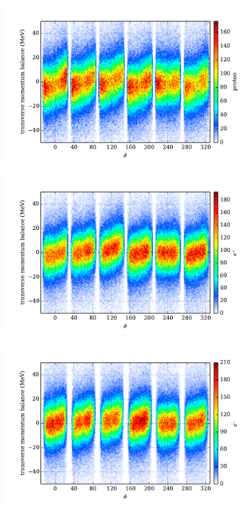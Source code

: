 \begin{figure}\begin{center}
\begin{subfigure}{0.4\columnwidth}
    \includegraphics[width=\columnwidth]{figures/pcor/pcor_mptbal_p.pdf}
\end{subfigure}
\begin{subfigure}{0.4\columnwidth}
    \includegraphics[width=\columnwidth]{figures/pcor/pcor_mptbal_pip.pdf}
\end{subfigure}
\begin{subfigure}{0.4\columnwidth}
    \includegraphics[width=\columnwidth]{figures/pcor/pcor_mptbal_pim.pdf}

\end{subfigure}
\end{center}
\end{figure}
